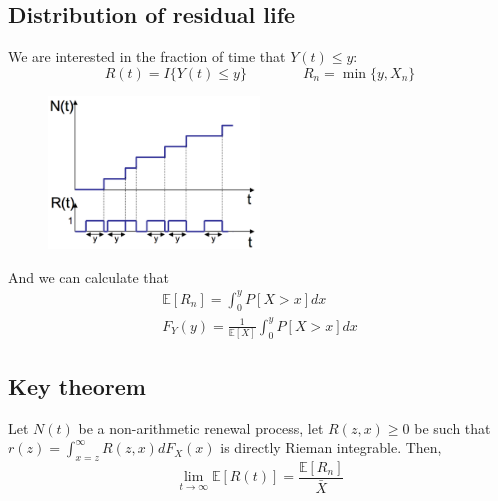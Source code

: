 \documentclass[12pt, openany]{report}
\newcommand{\E}{\mathbb{E}}
\theoremstyle{definition}
\begin{document}
\subsection{Distribution of residual life}
We are interested in the fraction of time that $Y(t)\le y$: 
\begin{equation}
	R(t)= I\{Y(t)\le y\} \qquad \qquad R_n = \min\{y, X_n\}
\end{equation}
\begin{figure}[H]
	\centering
	\includegraphics[width=0.5\textwidth]{img/residual.png}
\end{figure}
And we can calculate that 
\begin{equation}
	\begin{aligned}
		\E[R_n]= \int_0^y P[X>x]dx \\
		F_Y(y) = \frac{1}{\E[X]}\int_0^y P[X>x]dx
	\end{aligned}
\end{equation}
\subsection{Key theorem}
Let $N(t)$ be a non-arithmetic renewal process, let $R(z,x)\ge 0$ be such that $r(z)=\int_{x=z}^\infty R(z,x)dF_X(x)$ is directly Rieman integrable. Then, 
\begin{equation}
	\lim_{t\to \infty} \E[R(t)] = \frac{\E[R_n]}{\bar X}
\end{equation}
\end{document}
